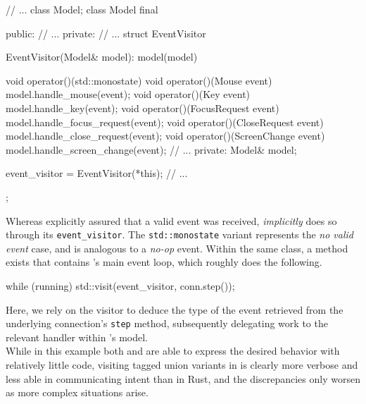 \begin{cppblock}
  // ...
  class Model;
  class Model final
  {
  public:
    // ...
  private:
    // ...
    struct EventVisitor
    {
      EventVisitor(Model& model): model(model) {}

      void operator()(std::monostate) {}
      void operator()(Mouse event) {
        model.handle_mouse(event);
      }
      void operator()(Key event) {
        model.handle_key(event);
      }
      void operator()(FocusRequest event) {
        model.handle_focus_request(event);
      }
      void operator()(CloseRequest event) {
        model.handle_close_request(event);
      }
      void operator()(ScreenChange event) {
        model.handle_screen_change(event);
      }
      // ...
    private:
      Model& model;
    } event_visitor = EventVisitor(*this);
    // ...
  };
\end{cppblock}

Whereas  \wmrs  explicitly assured  that  a  valid  event was  received,  \wmcpp
\textit{implicitly}  does so  through  its \texttt{event_visitor}.  The
\texttt{std::monostate} variant represents  the \textit{no valid event}
case,  and is  analogous to  a \textit{no-op}  event. Within  the same  class, a
method exists that contains \mbox{\wmcpp}'s  main event loop, which roughly does
the following.

\begin{cppblock}
  while (running)
    std::visit(event_visitor, conn.step());
\end{cppblock}

Here, we rely on the visitor to deduce  the type of the event retrieved from the
underlying connection's  \texttt{step} method,  subsequently delegating
work to the relevant handler within \wmcpp's model.\\

While in  this example  both \wmrs and  \wmcpp are able  to express  the desired
behavior with relatively little code, visiting  tagged union variants in \cpp is
clearly more verbose and less able in communicating intent than in Rust, and the
discrepancies only worsen as more complex situations arise\cite{stdvisitwrong}.
